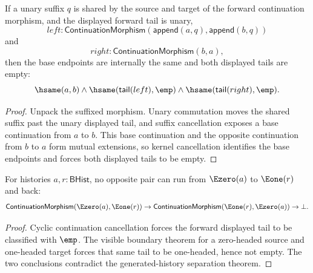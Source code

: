 \begin{theorem}
\label{thm:continuation-morphism-unary-suffix-cycle-tails-empty}
If a unary suffix $q$ is shared by the source and target of the forward
continuation morphism, and the displayed forward tail is unary,
$$
left:\mathsf{ContinuationMorphism}(\mathsf{append}(a,q),\mathsf{append}(b,q))
$$
and
$$
right:\mathsf{ContinuationMorphism}(b,a),
$$
then the base endpoints are internally the same and both displayed tails are
empty:
$$
\hsame(a,b)\land
\hsame(\mathsf{tail}(left),\emp)\land
\hsame(\mathsf{tail}(right),\emp).
$$
\end{theorem}
\begin{proof}
Unpack the suffixed morphism. Unary commutation moves the shared suffix past
the unary displayed tail, and suffix cancellation exposes a base continuation
from $a$ to $b$. This base continuation and the opposite continuation from
$b$ to $a$ form mutual extensions, so kernel cancellation identifies the base
endpoints and forces both displayed tails to be empty.
\end{proof}

\begin{theorem}
\label{thm:continuation-morphism-e0-e1-cycle-absurd}
For histories $a,r:\mathsf{BHist}$, no opposite pair can run from
$\Ezero(a)$ to $\Eone(r)$ and back:
$$
\mathsf{ContinuationMorphism}(\Ezero(a),\Eone(r))
\to
\mathsf{ContinuationMorphism}(\Eone(r),\Ezero(a))
\to
\bot.
$$
\end{theorem}
\begin{proof}
Cyclic continuation cancellation forces the forward displayed tail to be
classified with $\emp$. The visible boundary theorem for a zero-headed source
and one-headed target forces that same tail to be one-headed, hence not empty.
The two conclusions contradict the generated-history separation theorem.
\end{proof}

